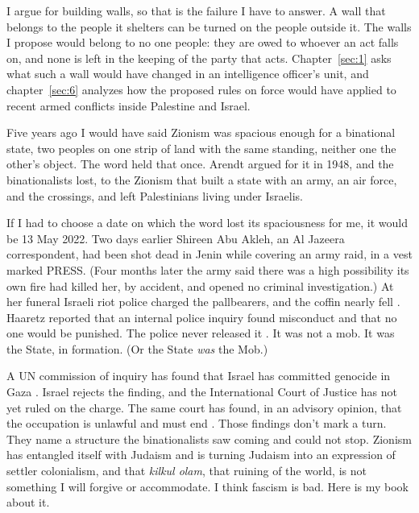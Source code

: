 I argue for building walls, so that is the failure I have to answer. A wall that belongs to the people it shelters can be turned on the people outside it. The walls I propose would belong to no one people: they are owed to whoever an act falls on, and none is left in the keeping of the party that acts. Chapter~\ref{sec:1} asks what such a wall would have changed in an intelligence officer's unit, and chapter~\ref{sec:6} analyzes how the proposed rules on force would have applied to recent armed conflicts inside Palestine and Israel.

Five years ago I would have said Zionism was spacious enough for a binational state, two peoples on one strip of land with the same standing, neither one the other's object. The word held that once. Arendt argued for it in 1948, and the binationalists lost, to the Zionism that built a state with an army, an air force, and the crossings, and left Palestinians living under Israelis.

If I had to choose a date on which the word lost its spaciousness for me, it would be 13 May 2022. Two days earlier Shireen Abu Akleh, an Al Jazeera correspondent, had been shot dead in Jenin while covering an army raid, in a vest marked PRESS. (Four months later the army said there was a high possibility its own fire had killed her, by accident, and opened no criminal investigation.) At her funeral Israeli riot police charged the pallbearers, and the coffin nearly fell \autocite{federman2022pallbearers}. Haaretz reported that an internal police inquiry found misconduct and that no one would be punished. The police never released it \autocite{aljazeera2022probe,ap2022clear}. It was not a mob. It was the State, in formation. (Or the State \emph{was} the Mob.)

A UN commission of inquiry has found that Israel has committed genocide in Gaza \autocite{coiopt2025genocide}. Israel rejects the finding, and the International Court of Justice has not yet ruled on the charge. The same court has found, in an advisory opinion, that the occupation is unlawful and must end \autocite{icj2024palestine}. Those findings don't mark a turn. They name a structure the binationalists saw coming and could not stop. Zionism has entangled itself with Judaism and is turning Judaism into an expression of settler colonialism, and that \emph{kilkul olam}, that ruining of the world, is not something I will forgive or accommodate. I think fascism is bad. Here is my book about it.

